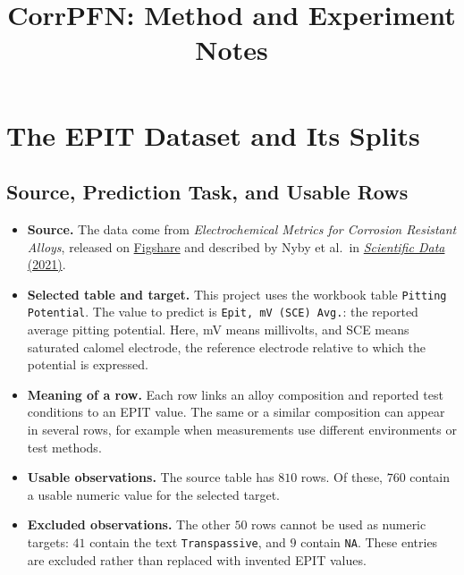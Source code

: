 \documentclass[11pt]{article}
\title{CorrPFN: Method and Experiment Notes}
\author{}
\date{}
\newenvironment{notes}
  {\begin{itemize}\setlength{\itemsep}{0.45em}\setlength{\parsep}{0pt}}
  {\end{itemize}}
\begin{document}
\maketitle


\section{The EPIT Dataset and Its Splits}
\label{sec:epit-dataset}

\subsection{Source, Prediction Task, and Usable Rows}
\label{sec:dataset-source}

\begin{notes}
    \item \textbf{Source.} The data come from
    \textit{Electrochemical Metrics for Corrosion Resistant Alloys},
    released on
    \href{https://figshare.com/articles/dataset/Electrochemical_Metrics_for_Corrosion_Resistant_Alloys/13038257}{Figshare}
    and described by Nyby et al.\ in
    \href{https://doi.org/10.1038/s41597-021-00840-y}{\textit{Scientific Data} (2021)}.

    \item \textbf{Selected table and target.} This project uses the workbook
    table \texttt{Pitting Potential}. The value to predict is
    \texttt{Epit, mV (SCE) Avg.}: the reported average pitting potential.
    Here, mV means millivolts, and SCE means saturated calomel electrode,
    the reference electrode relative to which the potential is expressed.

    \item \textbf{Meaning of a row.} Each row links an alloy composition
    and reported test conditions to an EPIT value. The same or a similar
    composition can appear in several rows, for example when measurements
    use different environments or test methods.

    \item \textbf{Usable observations.} The source table has \(810\) rows.
    Of these, \(760\) contain a usable numeric value for the selected target.

    \item \textbf{Excluded observations.} The other \(50\) rows cannot be
    used as numeric targets: \(41\) contain the text
    \texttt{Transpassive}, and \(9\) contain \texttt{NA}.
    These entries are excluded rather than replaced with invented EPIT values.
\end{notes}
\end{document}
